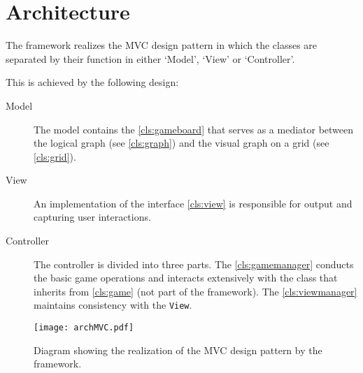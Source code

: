 \section{Architecture}
The \graphioli \gls{framework} realizes the \gls{MVC} design pattern in which the classes are separated by their function in either `Model', `View' or `Controller'.\par
This is achieved by the following design:\par

\begin{description}
	\item[Model] The model contains the \ref{cls:gameboard} that serves as a mediator between the logical \gls{graph} (see \ref{cls:graph}) and the visual graph on a \gls{grid} (see \ref{cls:grid}).
	\item[View] An implementation of the \gls{interface} \ref{cls:view} is responsible for output and capturing user interactions.
	\item[Controller] The controller is divided into three parts. The \ref{cls:gamemanager} conducts the basic game operations and interacts extensively with the class that inherits from \ref{cls:game} (not part of the framework). The \ref{cls:viewmanager} maintains consistency with the \texttt{View}.
\end{description}

\begin{figure}[h]
	\centering
	\texttt{[image: archMVC.pdf]}
	\caption{Diagram showing the realization of the \gls{MVC} design pattern by the framework.}
	\label{img:archMVC}
\end{figure}